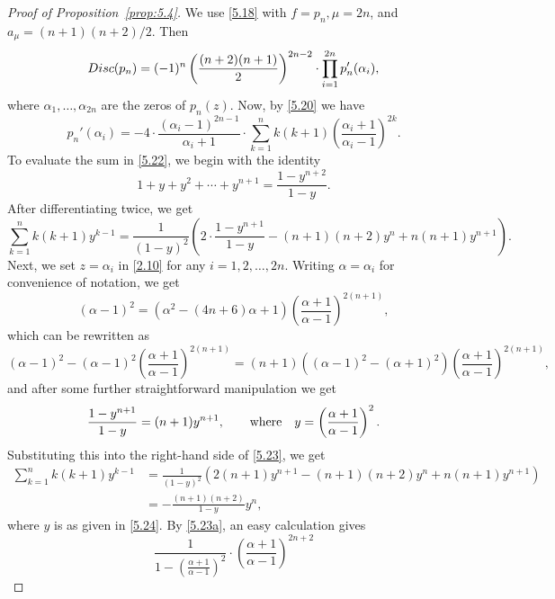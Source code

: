 \documentclass[10pt,a4paper]{amsart}
\begin{document}
\begin{proof}[Proof of Proposition~\ref{prop:5.4}]
We use \eqref{5.18} with $f=p_n, \mu=2n$, and $a_{\mu}=(n+1)(n+2)/2$. Then
\begin{equation}\label{5.21}
{\rm Disc}(p_n)=(-1)^n \left(\frac{(n+2)(n+1)}{2}\right)^{2n-2}
\cdot\prod_{i=1}^{2n}p_n'(\alpha_i),
\end{equation}
where $\alpha_1, \ldots, \alpha_{2n}$ are the zeros of $p_n(z)$. Now, by
\eqref{5.20} we have
\begin{equation}\label{5.22}
p_n'(\alpha_i) =-4\cdot \frac{(\alpha_i-1)^{2n-1}}{\alpha_i+1}\cdot 
\sum_{k=1}^n k(k+1)\left(\frac{\alpha_i+1}{\alpha_i-1}\right)^{2k}.
\end{equation}
To evaluate the sum in \eqref{5.22}, we begin with the identity
\[
1+y+y^2+\cdots+y^{n+1} = \frac{1-y^{n+2}}{1-y}.
\]
After differentiating twice, we get
\begin{equation}\label{5.23}
\sum_{k=1}^n k(k+1)y^{k-1} = \frac{1}{(1-y)^2}\left(2\cdot\frac{1-y^{n+1}}{1-y}
-(n+1)(n+2)y^n+n(n+1)y^{n+1}\right).
\end{equation}
Next, we set $z=\alpha_i$ in \eqref{2.10} for any $i=1,2, \ldots, 2n$. 
Writing $\alpha=\alpha_i$ for convenience of notation, we get
\begin{equation}\label{5.23a}
(\alpha-1)^2
=(\alpha^2-(4n+6)\alpha+1)\left(\frac{\alpha+1}{\alpha-1}\right)^{2(n+1)},
\end{equation}
which can be rewritten as
\[
(\alpha-1)^2-(\alpha-1)^2\left(\frac{\alpha+1}{\alpha-1}\right)^{2(n+1)}
=(n+1)\left((\alpha-1)^2-(\alpha+1)^2\right)
\left(\frac{\alpha+1}{\alpha-1}\right)^{2(n+1)},
\]
and after some further straightforward manipulation we get
\begin{equation}\label{5.24}
\frac{1-y^{n+1}}{1-y}=(n+1)y^{n+1},\qquad\hbox{where}\quad
y= \left(\frac{\alpha+1}{\alpha-1}\right)^2.
\end{equation}
Substituting this into the right-hand side of \eqref{5.23}, we get
\begin{align}
\sum_{k=1}^n k(k+1)y^{k-1} &= \frac{1}{(1-y)^2}\left(2(n+1)y^{n+1}
-(n+1)(n+2)y^n+n(n+1)y^{n+1}\right) \label{5.25}\\
&=-\frac{(n+1)(n+2)}{1-y}y^{n},\nonumber
\end{align}
where $y$ is as given in \eqref{5.24}. By \eqref{5.23a}, an easy calculation 
gives
\begin{equation}\label{5.26}
\frac{1}{1-\left(\frac{\alpha+1}{\alpha-1}\right)^2}\cdot
\left(\frac{\alpha+1}{\alpha-1}\right)^{2n+2}

\end{equation}
\end{proof}
\end{document}
